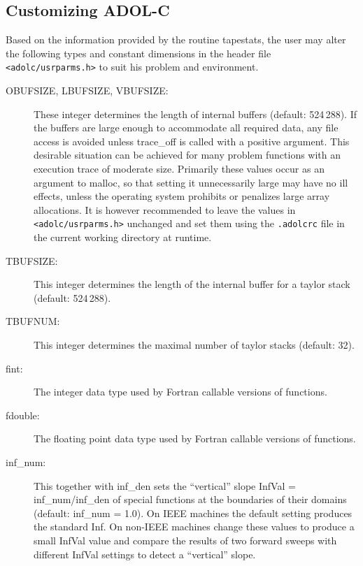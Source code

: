 \documentclass[11pt,twoside]{article}
\begin{document}
\subsection{Customizing ADOL-C}
\label{Customizing}
%
Based on the information provided by the routine {\sf tapestats}, the user may alter the
following types and constant dimensions in the header file \verb=<adolc/usrparms.h>=
to suit his problem and environment.

\begin{description}
\item[{\sf OBUFSIZE}, {\sf LBUFSIZE}, {\sf VBUFSIZE}{\rm :}] These integer determines the length of
in\-ter\-nal buf\-fers (default: 524$\,$288). If the buffers are large enough to accommodate all
required data, any file access is avoided unless {\sf trace\_off}
is called with a positive argument. This desirable situation can
be achieved for many problem functions with an execution trace of moderate
size. Primarily these values occur as an argument 
to {\sf malloc}, so that setting it unnecessarily large may have no
ill effects, unless the operating system prohibits or penalizes large
array allocations. It is however recommended to leave the values in
\texttt{<adolc/usrparms.h>} unchanged and set them using the
\texttt{.adolcrc} file in the current working directory at runtime.

\item[{\sf TBUFSIZE}{\rm :}] This integer determines the length of the 
in\-ter\-nal buf\-fer for a taylor stack (default: 524$\,$288). 

\item[{\sf TBUFNUM}{\rm :}] This integer determines the maximal number of taylor stacks (default: 32).

\item[{\sf fint}{\rm :}] The integer data type used by Fortran callable versions of functions.

\item[{\sf fdouble}{\rm :}] The floating point data type used by Fortran callable versions of functions.

\item[{\sf inf\_num}{\rm :}] This together with {\sf inf\_den}
sets the ``vertical'' slope {\sf InfVal} = {\sf inf\_num/inf\_den}  
of special functions at the boundaries of their domains (default: {\sf inf\_num} = 1.0). On IEEE machines 
the default setting produces the standard {\sf Inf}. On non-IEEE machines
change these values to produce a small {\sf InfVal} value and compare
the results of two forward sweeps with different {\sf InfVal} settings
to detect a ``vertical'' slope.


\end{description}
\end{document}
